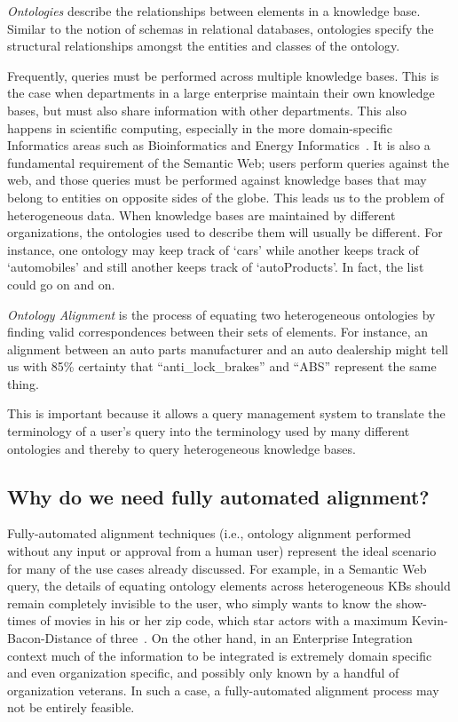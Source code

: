 \documentclass[letterpaper,twocolumn,12pt]{article}
\begin{document}
\textit{Ontologies} describe the relationships between elements in a knowledge base.
Similar to the notion of schemas in relational databases, ontologies specify the structural relationships amongst the entities and classes of the ontology.

Frequently, queries must be performed across multiple knowledge bases.
This is the case when departments in a large enterprise maintain their own knowledge bases, but must also share information with other departments. 
This also happens in scientific computing, especially in the more domain-specific Informatics areas such as Bioinformatics and Energy Informatics~\cite{cotterell:2012:oei}.
It is also a fundamental requirement of the Semantic Web; users perform queries against the web, and those queries must be performed against knowledge bases that may belong to entities on opposite sides of the globe. 
This leads us to the problem of heterogeneous data. 
When knowledge bases are maintained by different organizations, the ontologies used to describe them will usually be different. 
For instance, one ontology may keep track of `cars' while another keeps track of `automobiles' and still another keeps track of `autoProducts'. 
In fact, the list could go on and on.

\textit{Ontology Alignment} is the process of equating two heterogeneous ontologies by finding valid correspondences between their sets of elements. 
%
For instance, an alignment between an auto parts manufacturer and an auto dealership might tell us with 85\% certainty that ``anti\_lock\_brakes'' and ``ABS'' represent the same thing.

This is important because it allows a query management system to translate the terminology of a user's query into the terminology used by many different ontologies and thereby to query heterogeneous knowledge bases.

\subsection{Why do we need fully automated alignment?}
\label{subsec:automated}
Fully-automated alignment techniques (i.e., ontology alignment performed without any input or approval from a human user) represent the ideal scenario for many of the use cases already discussed. 
For example, in a Semantic Web query, the details of equating ontology elements across heterogeneous KBs should remain completely invisible to the user, who simply wants to know the show-times of movies in his or her zip code, which star actors with a maximum Kevin-Bacon-Distance of three~\cite{hayes:2000:graph}.
On the other hand, in an Enterprise Integration context much of the information to be integrated is extremely domain specific and even organization specific, and possibly only known by a handful of organization veterans. 
In such a case, a fully-automated alignment process may not be entirely feasible.
\end{document}
